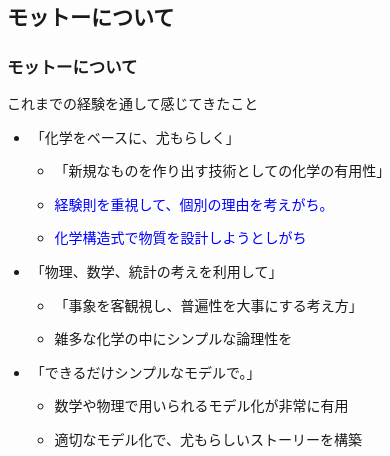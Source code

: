 \documentclass[unicode,12pt]{beamer}%
\begin{document}
\subsection{モットーについて}
\begin{frame}
	\frametitle{モットーについて}
		\begin{alertblock}{これまでの経験を通して感じてきたこと}
			\begin{itemize}
				\item 「化学をベースに、尤もらしく」
				\begin{itemize}
					\item 「新規なものを作り出す技術としての\alert{化学の有用性}」
					\item \textcolor{blue}{経験則を重視して、個別の理由を考えがち。}
					\item \textcolor{blue}{化学構造式で物質を設計しようとしがち}
				\end{itemize}
				\item 「物理、数学、統計の考えを利用して」
				\begin{itemize}
					\item 「\alert{事象を客観視し、普遍性を大事}にする考え方」
					\item 雑多な化学の中に\alert{シンプルな論理性を}
				\end{itemize}
				\item 「できるだけシンプルなモデルで。」
				\begin{itemize}
					\item 数学や物理で用いられる\alert{モデル化が非常に有用}
					\item 適切なモデル化で、尤もらしいストーリーを構築
				\end{itemize}
			\end{itemize}
		\end{alertblock}
\end{frame}
\end{document}
